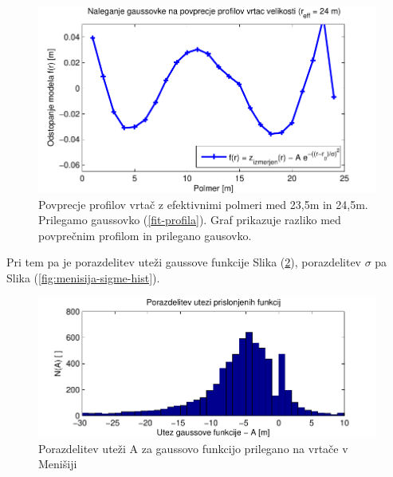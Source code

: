 \documentclass[a4paper, oneside, 12pt]{book}
\begin{document}
        \begin{figure}[H]
          \centering
          \includegraphics{slike/menisija-profil-21-fit}
          \caption{Povprecje profilov vrtač z efektivnimi polmeri med 23,5m in 24,5m. Prilegamo gaussovko (\ref{fit-profila}). Graf prikazuje razliko med povprečnim profilom in prilegano gausovko.}
          \label{fig:menisija-profil-21-fit}
        \end{figure}

        Pri tem pa je porazdelitev uteži gaussove funkcije Slika (\ref{fig:menisija-globine-hist}), porazdelitev $\sigma$ pa Slika (\ref{fig:menisija-sigme-hist}).

        \begin{figure}[H]
          \begin{center}
            \includegraphics{slike/menisija-globine-hist}
          \end{center}
          \caption{Porazdelitev uteži A za gaussovo funkcijo prilegano na vrtače v Menišiji}
          \label{fig:menisija-globine-hist}
        \end{figure}
\end{document}

